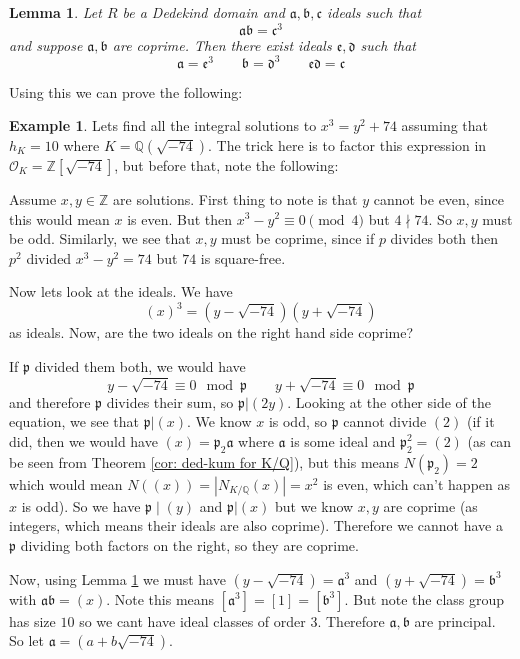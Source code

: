 \documentclass[11pt,a4paper]{report}
\theoremstyle{plain}
\newtheorem{lemma}[subsection]{Lemma}
\theoremstyle{definition}
\newtheorem{exmp}[subsection]{Example}
\theoremstyle{definition}
\newcommand{\ZZ}{\mathbb{Z}}
\def\QQ{\mathbb{Q}}
\def\gothb{\mathfrak{b}}
\def\gothc{\mathfrak{c}}
\def\gothp{\mathfrak{p}}
\def \OO {\mathcal{O}}
\def\gotha{\mathfrak{a}}
\begin{document}
	
	
	\begin{lemma}\label{lem: ideals mult to power}
		Let $R$ be a Dedekind domain and $\gotha,\gothb,\gothc$ ideals such that \[\gotha\gothb=\gothc^3\] and suppose $\gotha,\gothb$ are coprime. Then there exist ideals $\mathfrak{e},\mathfrak{d}$ such that \[\gotha=\mathfrak{e}^3 \qquad \gothb=\mathfrak{d}^3 \qquad \mathfrak{e}\mathfrak{d}=\gothc\] 
	\end{lemma}
	
	
	
	Using this we can prove the following:
	
	\begin{exmp}
		Lets find all the integral solutions to $x^3=y^2+74$ assuming that $h_K=10$ where $K=\QQ(\sqrt{-74})$. The trick here is to factor this expression in $\OO_K=\ZZ[\sqrt{-74}]$, but before that, note the following: 
		
		Assume $x,y \in \ZZ$ are solutions. First thing to note is that $y$ cannot be even, since this would mean $x$ is even. But then $x^3 -y^2 \equiv 0 \pmod 4$ but $4\nmid 74$. So $x,y$ must be odd. Similarly, we see that $x,y$ must be coprime, since if $p$ divides both then $p^2$ divided $x^3-y^2=74$ but $74$ is square-free. 
		
		
		Now lets look at the ideals.  We have \[(x)^3=(y-\sqrt{-74})(y+\sqrt{-74})\] as ideals. Now, are the two ideals on the right hand side coprime?
		
		If $\gothp$ divided them both, we would have \[y-\sqrt{-74} \equiv 0 \mod \gothp \qquad y+\sqrt{-74} \equiv 0 \mod \gothp \] and therefore $\gothp$ divides their sum, so $\gothp| (2y)$. Looking at the other side of the equation, we see that $\gothp|(x)$. We know $x$ is odd, so $\gothp$ cannot divide $(2)$ (if it did, then we would have $(x)=\gothp_2 \gotha$ where $\gotha$ is some ideal and $\gothp_2^2=(2)$ (as can be seen from Theorem \ref{cor: ded-kum for K/Q}), but this means $N(\gothp_2)=2$ which would mean $N((x))=|N_{K/\QQ}(x)|=x^2$ is even, which can't happen as $x$ is odd). So we have $\gothp \mid (y)$ and $\gothp|(x)$ but we know $x,y$ are coprime (as integers, which means their ideals are also coprime). Therefore we cannot have a $\gothp$ dividing both factors on the right, so they are coprime. 
		
		
		
		
		Now, using Lemma \ref{lem: ideals mult to power} we must have $(y-\sqrt{-74})=\gotha^3$ and $(y+\sqrt{-74})=\gothb^3$ with $\gotha\gothb=(x)$. Note this means $[\gotha^3]=[1]=[\gothb^3]$. But note the class group has size $10$ so we cant have ideal classes of order $3$. Therefore $\gotha,\gothb$ are principal. So let $\gotha=(a+b\sqrt{-74})$.
		

\end{exmp}
\end{document}

